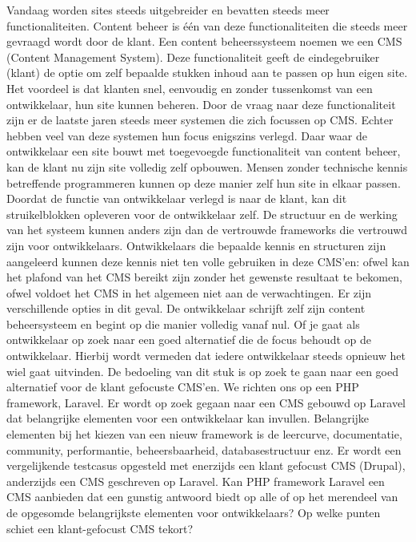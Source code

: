 \label{ch:inleiding}

Vandaag worden sites steeds uitgebreider en bevatten steeds meer functionaliteiten. Content beheer is één van deze functionaliteiten die steeds meer gevraagd wordt door de klant. Een content beheerssysteem noemen we een CMS (Content Management System). Deze functionaliteit geeft de eindegebruiker (klant) de optie om zelf bepaalde stukken inhoud aan te passen op hun eigen site. Het voordeel is dat klanten snel, eenvoudig en zonder tussenkomst van een ontwikkelaar, hun site kunnen beheren. 
\newline\newline
Door de vraag naar deze functionaliteit zijn er de laatste jaren steeds meer systemen die zich focussen op CMS. Echter hebben veel van deze systemen hun focus enigszins verlegd. Daar waar de ontwikkelaar een site bouwt met toegevoegde functionaliteit van content beheer, kan de klant nu zijn site volledig zelf opbouwen. Mensen zonder technische kennis betreffende programmeren kunnen op deze manier zelf hun site in elkaar passen. 
\newline\newline
Doordat de functie van ontwikkelaar verlegd is naar de klant, kan dit struikelblokken opleveren voor de ontwikkelaar  zelf. De structuur en de werking van het systeem kunnen anders zijn dan de vertrouwde frameworks die vertrouwd zijn voor ontwikkelaars. Ontwikkelaars die bepaalde kennis en structuren zijn aangeleerd kunnen deze kennis niet ten volle gebruiken in deze CMS'en: ofwel kan het plafond van het CMS bereikt zijn zonder het gewenste resultaat te bekomen, ofwel voldoet het CMS in het algemeen niet aan de verwachtingen. 
\newline\newline
Er zijn verschillende opties in dit geval. De ontwikkelaar schrijft zelf zijn content beheersysteem en begint op die manier volledig vanaf nul. Of je gaat als ontwikkelaar op zoek naar een goed alternatief die de focus behoudt op de ontwikkelaar. Hierbij wordt vermeden dat iedere ontwikkelaar steeds opnieuw het wiel gaat uitvinden.
\newline\newline
De bedoeling van dit stuk is op zoek te gaan naar een goed alternatief voor de klant gefocuste CMS'en. We richten ons op een PHP framework, Laravel. Er wordt op zoek gegaan naar een CMS gebouwd op Laravel dat belangrijke elementen voor een ontwikkelaar kan invullen. Belangrijke elementen bij het kiezen van een nieuw framework is de leercurve, documentatie, community, performantie, beheersbaarheid, databasestructuur enz. Er wordt een vergelijkende testcasus opgesteld met enerzijds een klant gefocust CMS (Drupal), anderzijds een CMS geschreven op Laravel.
\newline\newline
Kan PHP framework Laravel een CMS aanbieden dat een gunstig antwoord biedt op alle of op het merendeel van de opgesomde belangrijkste elementen voor ontwikkelaars? Op welke punten schiet een klant-gefocust CMS tekort?
